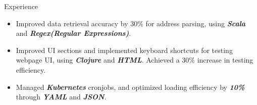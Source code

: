 \documentclass{resume} %
\begin{document}
\begin{workSection}{Experience}
\begin{itemize}
            \item Improved data retrieval accuracy by 30\% for address parsing, using \textit{\textbf{Scala}} and \textit{\textbf{Regex(Regular Expressions)}}.
            \item Improved UI sections and implemented keyboard shortcuts for testing webpage UI, using \textit{\textbf{Clojure}} and \textit{\textbf{HTML}}. Achieved a 30\% increase in testing efficiency.
            \item Managed \textit{\textbf{Kubernetes}} cronjobs, and optimized loading efficiency by \textit{\textbf{10\%}} through \textit{\textbf{YAML}} and \textit{\textbf{JSON}}.
      \end{itemize}

      \experienceItemOneLine[
            org=CodePro Edu.,
            title=Software Engineer,
            time=Dec. 2019 – Dec. 2020
      ]

      \experienceItemOneLine[
            org=NCTU Free5gc,
            title=Back End Engineer,
            time=Jul. 2019 – Nov. 2019
      ]

      \experienceItemOneLine[
            org=MoTC Taiwan,
            title=Embedded System Engineer,
            time=June 2016 – Sep. 2016
      ]


\end{workSection}

\education{
      \educationItem[
      university=National Chiao Tung University (NCTU),
      location=Hsinchu{,} TW,
      program=B.S.{,} Computer Science,
      graduation=2018
      ]
}
\end{document}
